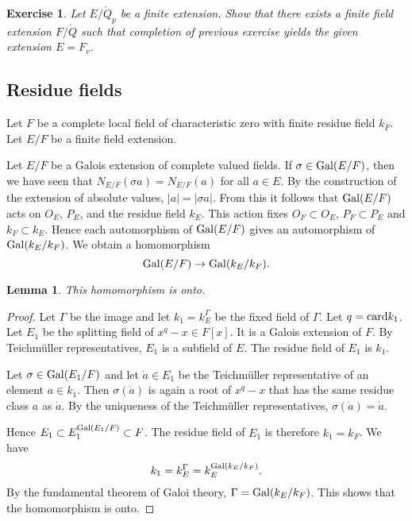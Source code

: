 \documentclass{amsart}
\newtheorem{lemma}[equation]{Lemma}
\newtheorem{exercise}{Exercise}
\def\abs#1{{|#1|}}
\begin{document}
\begin{exercise}  Let $E/\ring{Q}_p$ be a finite extension.  Show that there
exists a finite field extension $F/\ring{Q}$ such that completion of previous
exercise yields the given extension $E=F_v$.
\end{exercise}

\subsection{Residue fields}

Let $F$ be a complete local field of characteristic zero with finite residue field $k_F$.
Let $E/F$ be a finite field extension.

Let $E/F$ be a Galois extension of complete valued fields.
If $\sigma\in{\operatorname{Gal}}(E/F)$, then we have seen that $N_{E/F}(\sigma a) = N_{E/F}(a)$
for all $a\in E$.  By the construction of the extension of absolute values,
$\abs{a}=\abs{\sigma{a}}$.  From this it follows that ${\operatorname{Gal}}(E/F)$
acts on $O_E$, $P_E$, and the residue field $k_E$.
This action fixes $O_F\subset O_E$, $P_F\subset P_E$ and $k_F\subset k_E$.
Hence each automorphism of ${\operatorname{Gal}}(E/F)$ gives an automorphism of 
${\operatorname{Gal}}(k_E/k_F)$.  We obtain a homomorphism
\[
{\operatorname{Gal}}(E/F)\to {\operatorname{Gal}}(k_E/k_F).
\]

\begin{lemma} This homomorphism is onto.
\end{lemma}

\begin{proof} Let $\Gamma$ be the image and let $k_1 = k_E^\Gamma$ be the fixed
field of $\Gamma$.  Let $q={\operatorname{card}}{k_1}$.  Let $E_1$ be the splitting field
of $x^q-x\in F[x]$.  It is a Galois extension of $F$.
By Teichm\"uller representatives, $E_1$ is a subfield
of $E$.  The residue field of $E_1$ is $k_1$.

Let $\sigma\in {\operatorname{Gal}}(E_1/F)$ and let $\dot a\in E_1$ be 
the Teichm\"uller representative of an element $a\in k_1$.
Then $\sigma (\dot a)$ is again a root of $x^q-x$ that has the
same residue class $a$ as $\dot a$.  By the uniqueness of the Teichm\"uller
representatives, $\sigma(\dot a) = \dot a$.  

Hence $E_1\subset E_1^{{\operatorname{Gal}}(E_1/F)} \subset F$.  The residue field of 
$E_1$ is therefore $k_1 = k_F$.  We have
\[
k_1 = k_E^\Gamma = k_E^{{\operatorname{Gal}}(k_E/k_F)}.
\]
By the fundamental theorem of Galoi theory, $\Gamma={\operatorname{Gal}}(k_E/k_F)$.
This shows that the homomorphism is onto.
\end{proof}
\end{document}
